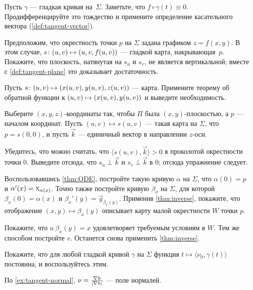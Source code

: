 \begin{multicols}{2}

\setcounter{eqtn}{0}

Пусть $\gamma$ --- гладкая кривая на~$\Sigma$.
Заметьте, что $f\circ\gamma(t)\equiv 0$.
Продифференцируйте это тождество и примените определение касательного вектора (\ref{def:tangent-vector}).

Предположим, что окрестность точки $p$ на $\Sigma$ задана графиком $z=f(x,y)$.
В этом случае, $s\:(u,v)\z\mapsto (u,v,f(u,v))$ --- гладкой карта, накрывающая~$p$.
Покажите, что плоскость, натянутая на $s_u$ и $s_v$, не является вертикальной;
вместе с \ref{def:tangent-plane} это доказывает достаточность.

Пусть
$s\:(u,v)\z\mapsto(x(u,v),y(u,v),z(u,v))$ --- карта.
Примените теорему об обратной функции к $(u,v)\z\mapsto(x(u,v),y(u,v))$ и выведите необходимость.

Выберите $(x,y,z)$-координаты так, чтобы $\Pi$ была $(x,y)$-плоскостью, а $p$ --- началом координат.
Пусть $(u,v)\mapsto s(u,v)$ --- такая карта на $\Sigma$, что $p=s(0,0)$,
и пусть $\vec k$ --- единичный вектор в направлении $z$-оси.

Убедитесь, что можно считать, что $\langle s(u,v),\vec k\rangle>0$ в проколотой окрестности точки $0$.
Выведите отсюда, что $s_u\perp \vec k$ и $s_v\perp \vec k$ в
$0$; отсюда упражнение следует.

Воспользовавшись \ref{thm:ODE}, постройте такую кривую $\alpha$ на $\Sigma$, что $\alpha(0)=p$ и $\alpha'(x)\z=\vec x_{\alpha(x)}$.
Точно также постройте кривую $\beta_x$ на $\Sigma$, для которой $\beta_x(0)=\alpha(x)$ и $\beta_x'(y)=\vec y_{\beta_x(y)}$.
Применив \ref{thm:inverse}, покажите, что отображение $(x,y)\mapsto \beta_x(y)$ описывает карту малой окрестности $W$ точки $p$.

Покажите, что $u\:\beta_x(y)= x$ удовлетворяет требуемым условиям в $W$.
Тем же способом постройте $v$.
Останется снова применить \ref{thm:inverse}.

Покажите, что для любой гладкой кривой $\gamma$ на $\Sigma$ функция $t\mapsto \langle\nu_0,\gamma(t)\rangle$ постоянна, и воспользуйтесь этим.

По \ref{ex:tangent-normal}, $\nu=\tfrac{\nabla h}{|\nabla h|}$ --- поле нормалей.


\end{multicols}
